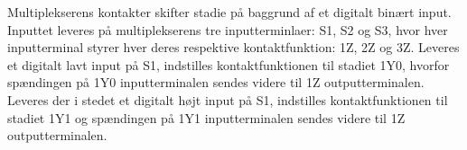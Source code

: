 Multiplekserens kontakter skifter stadie på baggrund af et digitalt binært input. Inputtet leveres på multiplekserens tre inputterminlaer: S1, S2 og S3, hvor hver inputterminal styrer hver deres respektive kontaktfunktion: 1Z, 2Z og 3Z. Leveres et digitalt lavt input på S1, indstilles kontaktfunktionen til stadiet 1Y0, hvorfor spændingen på 1Y0 inputterminalen sendes videre til 1Z outputterminalen. Leveres der i stedet et digitalt højt input på S1, indstilles kontaktfunktionen til stadiet 1Y1 og spændingen på 1Y1 inputterminalen sendes videre til 1Z outputterminalen.\\                    
